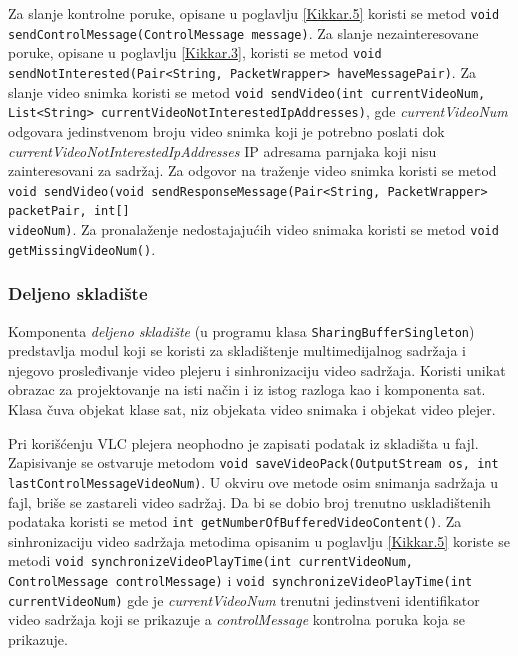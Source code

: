 \documentclass[12pt,oneside]{memoir}
\begin{document}
Za slanje kontrolne poruke, opisane u poglavlju \ref{Kikkar.5} koristi se metod \texttt{void \\ sendControlMessage(ControlMessage message)}. Za slanje nezainteresovane poruke, opisane u poglavlju \ref{Kikkar.3},  koristi se metod \texttt{void sendNotInterested(Pair<String, PacketWrapper> haveMessagePair)}. Za slanje video snimka koristi se metod \texttt{void sendVideo(int currentVideoNum, \\List<String> currentVideoNotInterestedIpAddresses)}, gde \textit{currentVideoNum} odgovara jedinstvenom broju video snimka koji je potrebno poslati dok \textit{currentVideoNotInterestedIpAddresses} IP adresama parnjaka koji nisu zainteresovani za sadržaj. Za odgovor na traženje video snimka koristi se metod \texttt{void sendVideo(void sendResponseMessage(Pair<String, PacketWrapper> packetPair, int[]\\ videoNum)}. Za pronalaženje nedostajajućih video snimaka koristi se metod \texttt{void getMissingVideoNum()}.


\subsubsection{Deljeno skladište}
\label{implementacija.2.3.7}

Komponenta \textit{deljeno skladište} (u programu klasa \texttt{SharingBufferSingleton}) predstavlja modul koji se koristi za skladištenje multimedijalnog sadržaja i njegovo prosleđivanje video plejeru i sinhronizaciju video sadržaja. Koristi unikat obrazac za projektovanje na isti način i iz istog razloga kao i komponenta sat. Klasa čuva objekat klase sat, niz objekata video snimaka i objekat video plejer.

Pri korišćenju VLC plejera neophodno je zapisati podatak iz skladišta u fajl. Zapisivanje se ostvaruje metodom \texttt{void saveVideoPack(OutputStream os, int lastControlMessageVideoNum)}. U okviru ove metode osim snimanja sadržaja u fajl, briše se zastareli video sadržaj. Da bi se dobio broj trenutno uskladištenih podataka koristi se metod \texttt{int getNumberOfBufferedVideoContent()}. Za sinhronizaciju video sadržaja metodima opisanim u poglavlju \ref{Kikkar.5} koriste se metodi \texttt{void synchronizeVideoPlayTime(int currentVideoNum, ControlMessage controlMessage)} i \texttt{void synchronizeVideoPlayTime(int currentVideoNum)} gde je \textit{currentVideoNum} trenutni jedinstveni identifikator video sadržaja koji se prikazuje a \textit{controlMessage} kontrolna poruka koja se prikazuje. 
\end{document}

